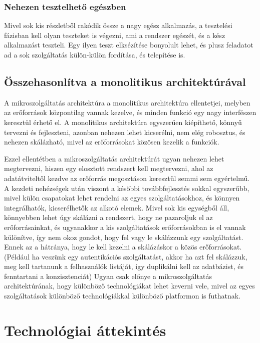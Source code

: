 \documentclass[11pt,magyar,a4paper,twoside,]{report}
\begin{document}
\subsubsection{Nehezen tesztelhető
egészben}\label{nehezen-tesztelhetux151-eguxe9szben}

Mivel sok kis részletből rakódik össze a nagy egész alkalmazás, a
tesztelési fázisban kell olyan teszteket is végezni, ami a rendszer
egészét, és a kész alkalmazást teszteli. Egy ilyen teszt elksézítése
bonyolult lehet, és plusz feladatot ad a sok szolgáltatás külön-külön
fordítása, és telepítése is.

\subsection{Összehasonlítva a monolitikus
architektúrával}\label{uxf6sszehasonluxedtva-a-monolitikus-architektuxfaruxe1val}

A mikroszolgáltatás architektúra a monolitikus architektúra ellentetjei,
melyben az erőforrások központilag vannak kezelve, és minden funkció egy
nagy interfészen keresztül érhető el. A monolitikus architektúra
egyszerűen kiépíthető, könnyű tervezni és fejleszteni, azonban nehezen
lehet kicserélni, nem elég robosztus, és nehezen skálázható, mivel az
erőforrásokat közösen kezelik a funkciók.

Ezzel ellentétben a mikroszolgáltatás architektúrát ugyan nehezen lehet
megtervezni, hiszen egy elosztott rendszert kell megtervezni, ahol az
adatátviteltől kezdve az erőforrás megosztáson keresztül semmi sem
egyértelmű. A kezdeti nehézségek után viszont a későbbi továbbfejlesztés
sokkal egyszerűbb, mivel külön csapatokat lehet rendelni az egyes
szolgáltatásokhoz, és könnyen integrálhatók, kicserélhetők az alkotó
elemek. Mivel sok kis egységből áll, könnyebben lehet úgy skálázni a
rendszert, hogy ne pazaroljuk el az erőforrásainkat, és ugyanakkor a kis
szolgáltatások erőforrásokban is el vannak különítve, így nem okoz
gondot, hogy fel vagy le skálázzunk egy szolgáltatást. Ennek az a
hátránya, hogy le kell kezelni a skálázáskor a közös
erőforrásokat.(Például ha veszünk egy autentikációs szolgáltatást, akkor
ha azt fel skálázzuk, meg kell tartanunk a felhasználók listáját, így
duplikálni kell az adatbázist, és fenntartani a konzisztenciát) Ugyan
csak előnye a mikroszolgáltatás architektúrának, hogy különböző
technológiákat lehet keverni vele, mivel az egyes szolgáltatások
különböző technológiákkal különböző platformon is futhatnak.

\section{Technológiai
áttekintés}\label{technoluxf3giai-uxe1ttekintuxe9s}
\end{document}
